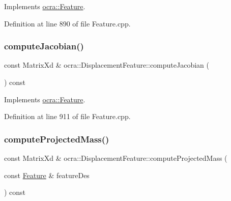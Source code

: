 Implements \hyperlink{classocra_1_1Feature_a4fb8eeeed978a1f727ec43cd1bd18d78}{ocra\+::\+Feature}.



Definition at line 890 of file Feature.\+cpp.

\hypertarget{classocra_1_1DisplacementFeature_a87e2abee5d1072e142dcab99193699da}{}\label{classocra_1_1DisplacementFeature_a87e2abee5d1072e142dcab99193699da} 
\subsubsection{\texorpdfstring{compute\+Jacobian()}{computeJacobian()}\hspace{0.1cm}{\footnotesize\ttfamily [2/2]}}
{\footnotesize\ttfamily const Matrix\+Xd \& ocra\+::\+Displacement\+Feature\+::compute\+Jacobian (\begin{DoxyParamCaption}{ }\end{DoxyParamCaption}) const\hspace{0.3cm}{\ttfamily [virtual]}}



Implements \hyperlink{classocra_1_1Feature_adbab3b388657555abb805bb971c2491f}{ocra\+::\+Feature}.



Definition at line 911 of file Feature.\+cpp.

\hypertarget{classocra_1_1DisplacementFeature_a3c72ecae0cb33a812c66b0770baf09bf}{}\label{classocra_1_1DisplacementFeature_a3c72ecae0cb33a812c66b0770baf09bf} 
\subsubsection{\texorpdfstring{compute\+Projected\+Mass()}{computeProjectedMass()}\hspace{0.1cm}{\footnotesize\ttfamily [1/2]}}
{\footnotesize\ttfamily const Matrix\+Xd \& ocra\+::\+Displacement\+Feature\+::compute\+Projected\+Mass (\begin{DoxyParamCaption}\item[{const \hyperlink{classocra_1_1Feature}{Feature} \&}]{feature\+Des }\end{DoxyParamCaption}) const\hspace{0.3cm}{\ttfamily [virtual]}}



